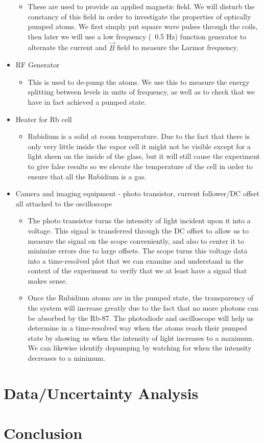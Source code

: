 \documentclass{article}
\begin{document}
\begin{itemize}
\begin{itemize}
      \item These are used to provide an applied magnetic field.  We will disturb the constancy of this field in order to investigate the properties of optically pumped atoms.  We first simply put square wave pulses through the coils, then later we will use a low frequency (~0.5 Hz) function generator to alternate the current and $\vec{B}$ field to measure the Larmor frequency.
    \end{itemize}
    \item RF Generator
    \begin{itemize}
      \item This is used to de-pump the atoms.  We use this to measure the energy splitting between levels in units of frequency, as well as to check that we have in fact achieved a pumped state.
    \end{itemize}
    \item Heater for Rb cell
    \begin{itemize}
      \item Rubidium is a solid at room temperature.  Due to the fact that there is only very little inside the vapor cell it might not be visible except for a light sheen on the inside of the glass, but it will still cause the experiment to give false results so we elevate the temperature of the cell in order to ensure that all the Rubidium is a gas.
    \end{itemize}
    \item Camera and imaging equipment - photo transistor, current follower/DC offset all attached to the oscilloscope
    \begin{itemize}
      \item The photo transistor turns the intensity of light incident upon it into a voltage.  This signal is transferred through the DC offset to allow us to measure the signal on the scope conveniently, and also to center it to minimize errors due to large offsets.  The scope turns this voltage data into a time-resolved plot that we can examine and understand in the context of the experiment to verify that we at least have a signal that makes sense.
      \item Once the Rubidium atoms are in the pumped state, the transparency of the system will increase greatly due to the fact that no more photons can be absorbed by the Rb-87.  The photodiode and oscilloscope will help us determine in a time-resolved way when the atoms reach their pumped state by showing us when the intensity of light increases to a maximum.  We can likewise identify depumping by watching for when the intensity decreases to a minimum.
    \end{itemize}
  \end{itemize}

\section{Data/Uncertainty Analysis}%

\section{Conclusion}%

%
%
\end{document}
